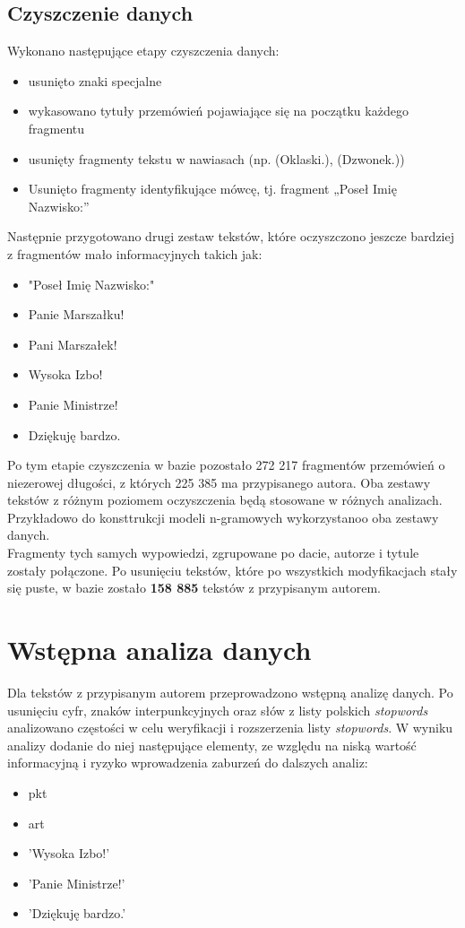 \documentclass[a4paper,11pt,twoside]{report}
\theoremstyle{definition}
\begin{document}
\section{Czyszczenie danych}
Wykonano następujące etapy czyszczenia danych: 
\begin{itemize}
 \item usunięto znaki specjalne 
 \item wykasowano tytuły przemówień pojawiające się na początku każdego fragmentu
 \item usunięty fragmenty tekstu w nawiasach (np. (Oklaski.), (Dzwonek.))
 \item Usunięto fragmenty identyfikujące mówcę, tj. fragment „Poseł Imię Nazwisko:”
\end{itemize}

Następnie przygotowano drugi zestaw tekstów, które oczyszczono jeszcze bardziej z fragmentów mało informacyjnych takich jak:
\begin{itemize}
 \item "Poseł Imię Nazwisko:"
 \item Panie Marszałku!
 \item Pani Marszałek!
 \item Wysoka Izbo!
 \item Panie Ministrze!
 \item Dziękuję bardzo.

\end{itemize}

Po tym etapie czyszczenia w bazie pozostało 272 217 fragmentów przemówień o niezerowej długości, z których 225 385 ma przypisanego autora. Oba zestawy tekstów z różnym poziomem oczyszczenia będą stosowane w różnych analizach. Przykładowo do konsttrukcji modeli n-gramowych wykorzystanoo oba zestawy danych. \\
Fragmenty tych samych wypowiedzi, zgrupowane po dacie, autorze i tytule zostały połączone.
Po usunięciu tekstów, które po wszystkich modyfikacjach stały się puste, w bazie zostało \textbf{158 885} tekstów z przypisanym autorem.


\chapter{Wstępna analiza danych}

Dla tekstów z przypisanym autorem przeprowadzono wstępną analizę danych. Po usunięciu cyfr, znaków interpunkcyjnych oraz słów z listy polskich \textit{stopwords} analizowano częstości w celu weryfikacji i rozszerzenia listy \textit{stopwords}. W wyniku analizy dodanie do niej następujące elementy, ze względu na niską wartość informacyjną i ryzyko wprowadzenia zaburzeń do dalszych analiz:
\begin{itemize}
\item pkt \item art \item 'Wysoka Izbo!' \item 'Panie Ministrze!' \item 'Dziękuję bardzo.'
\end{itemize}
\end{document}
